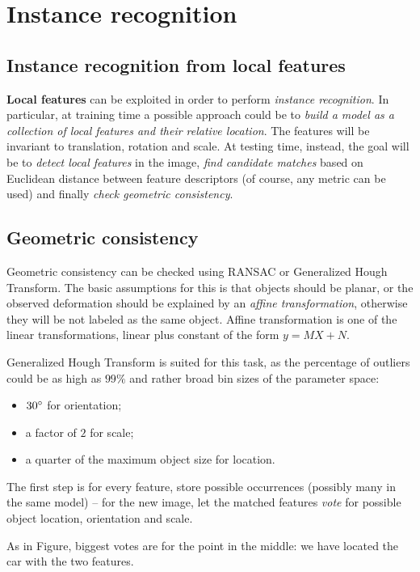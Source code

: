 \documentclass[10pt]{report}
\begin{document}
\section{Instance recognition}
\label{sec:org790deb1}
\subsection{Instance recognition from local features}
\label{sec:orgf3266e1}
\textbf{Local features} can be exploited in order to perform \emph{instance recognition}. In particular, at training time a possible approach could be to \emph{build a model as a collection of local features and their relative location}. The features will be invariant to translation, rotation and scale. At testing time, instead, the goal will be to \emph{detect local features} in the image, \emph{find candidate matches} based on Euclidean distance between feature descriptors (of course, any metric can be used) and finally \emph{check geometric consistency}.

\subsection{Geometric consistency}
\label{sec:orgd6eb622}

Geometric consistency can be checked using RANSAC or Generalized Hough Transform. The basic assumptions for this is that objects should be planar, or the observed deformation should be explained by an \emph{affine transformation}, otherwise they will be not labeled as the same object. Affine transformation is one of the linear transformations, linear plus constant of the form \(y = MX + N\).

Generalized Hough Transform is suited for this task, as the percentage of outliers could be as high as \(99\%\) and rather broad bin sizes of the parameter space:
\begin{itemize}
\item \(30\degree\) for orientation;
\item a factor of \(2\) for scale;
\item a quarter of the maximum object size for location.
\end{itemize}

The first step is for every feature, store possible occurrences (possibly many in the same model) -- for the new image, let the matched features \emph{vote} for possible object location, orientation and scale.

As in Figure, biggest votes are for the point in the middle: we have located the car with the two features.
\end{document}
